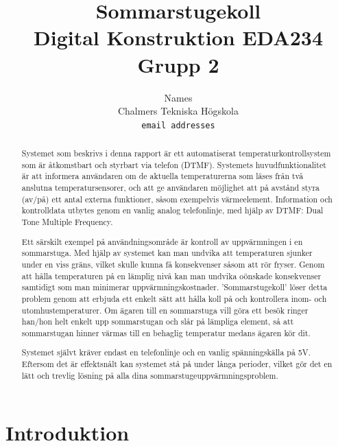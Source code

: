 \documentclass[a4paper,11pt]{article}
\begin{document}
\title{Sommarstugekoll \\
	Digital Konstruktion EDA234 \\ Grupp 2}
\author{Names \\
   Chalmers Tekniska Högskola \\
   \texttt{email addresses}}

\maketitle

\pagebreak

\tableofcontents

\pagebreak

\begin{abstract}

	Systemet som beskrivs i denna rapport är ett automatiserat temperaturkontrollsystem som är åtkomstbart och styrbart via
	telefon (DTMF). Systemets huvudfunktionalitet är att informera användaren om de aktuella temperaturerna som läses från
	två anslutna temperatursensorer, och att ge användaren möjlighet att på avstånd styra (av/på) ett antal externa funktioner,
	såsom exempelvis värmeelement. Information och kontrolldata utbytes genom en vanlig analog telefonlinje, med hjälp av DTMF:
	Dual Tone Multiple Frequency. 

	Ett särskilt exempel på användningsområde är kontroll av uppvärmningen i en sommarstuga. Med hjälp av systemet kan man
	undvika att temperaturen sjunker under en viss gräns, vilket skulle kunna få konsekvenser såsom att rör fryser. Genom att
	hålla temperaturen på en lämplig nivå kan man undvika oönskade konsekvenser samtidigt som man minimerar uppvärmningskostnader.
	'Sommarstugekoll' löser detta problem genom att erbjuda ett enkelt sätt att hålla koll på och kontrollera inom- och utomhustemperaturer.
	Om ägaren till en sommarstuga vill göra ett besök ringer han/hon helt enkelt upp sommarstugan och slår på lämpliga element, så att
	sommarstugan hinner värmas till en behaglig temperatur medans ägaren kör dit.

	Systemet självt kräver endast en telefonlinje och en vanlig spänningskälla på 5V. Eftersom det är effektsnålt kan systemet stå
	på under långa perioder, vilket gör det en lätt och trevlig lösning på alla dina sommarstugeuppvärmningsproblem.

\end{abstract}

\section{Introduktion}
\end{document}
